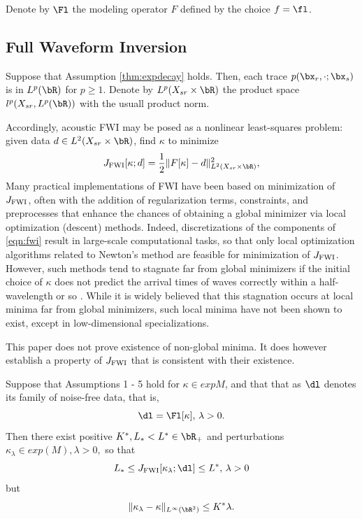 Denote by $\Fl$ the modeling operator $F$ defined by the choice $f=\fl$.

\subsection{Full Waveform Inversion}

Suppose that Assumption \ref{thm:expdecay} holds. Then, each trace $p(\bx_r,\cdot;\bx_s)$ is in $L^{p}(\bR)$ for $p
\ge 1$.
Denote by $L^p(X_{sr} \times \bR)$ the product space $l^p(X_{sr},L^p(\bR))$
with the usuall product norm. 

Accordingly, acoustic FWI may be posed as a nonlinear least-squares
problem: given data $d \in
L^2(X_{sr}\times \bR)$, find $\kappa$ to minimize
\begin{equation}
  \label{eqn:fwi}
  J_{\rm FWI}[\kappa;d]= \frac{1}{2}\|F[\kappa]-d\|^2_{L^2(X_{sr} \times \bR)},
\end{equation}
Many practical implementations of FWI have been based on minimization
of $J_{\rm FWI}$, often with the addition of regularization terms,
constraints, and preprocesses that enhance the chances of obtaining a
global minimizer via local optimization (descent) methods.  Indeed,
discretizations of the components of \ref{eqn:fwi} result in
large-scale computational tasks, so that only local optimization
algorithms related to Newton's method are feasible for minimization of
$J_{\rm FWI}$. However, such
methods tend to stagnate far from global
minimizers if the initial choice of $\kappa$ does not predict the
arrival times of waves correctly within a half-wavelength or so
\cite[]{GauTarVir:86,VirieuxOperto:09}. While it is widely believed
that this stagnation occurs at local minima far from global
minimizers, such local minima have not been shown to exist, except in
low-dimensional specializations.

This paper does not prove existence of non-global minima. It does
however establish a property of $J_{\rm FWI}$ that is consistent with
their existence.

\begin{theorem}
  \label{thm:fwi}
  Suppose that Assumptions 1 - 5 hold
  for $\kappa \in exp{M}$, and that that
as  $\dl$ denotes its family of noise-free data, that is,
  \[
    \dl = \Fl[\kappa], \, \lambda > 0.
  \]
  Then there exist positive $K^*, L_*<L^* \in \bR_+$ and
  perturbations $\kappa_{\lambda} \in exp(M), \lambda > 0,$ so that
  \[
   L_* \le  J_{\rm FWI}[\kappa_{\lambda};\dl] \le L^*, \,\lambda > 0
  \]
  but
  \[
    \|\kappa_{\lambda} - \kappa\|_{L^{\infty}(\bR^3)} \le K^*\lambda.
\]
\end{theorem}

